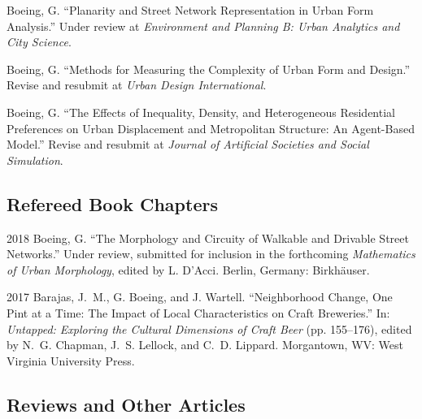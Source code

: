\documentclass{academiccv}
\begin{document}
\begin{tablist}

\item[\the\year] \tab Boeing, G. \enquote{Planarity and Street Network Representation in Urban Form Analysis.} Under review at \textit{Environment and Planning B: Urban Analytics and City Science}.

\item[\the\year] \tab Boeing, G. \enquote{Methods for Measuring the Complexity of Urban Form and Design.} Revise and resubmit at \textit{Urban Design International}.

\item[\the\year] \tab Boeing, G. \enquote{The Effects of Inequality, Density, and Heterogeneous Residential Preferences on Urban Displacement and Metropolitan Structure: An Agent-Based Model.} Revise and resubmit at \textit{Journal of Artificial Societies and Social Simulation}.

\end{tablist}



\subsection*{Refereed Book Chapters}

\begin{tablist}

\item[2018] \tab Boeing, G. \enquote{The Morphology and Circuity of Walkable and Drivable Street Networks.} Under review, submitted for inclusion in the forthcoming \textit{Mathematics of Urban Morphology}, edited by L. D'Acci. Berlin, Germany: Birkhäuser.

\item[2017] \tab Barajas, J.~M., G. Boeing, and J. Wartell. \enquote{Neighborhood Change, One Pint at a Time: The Impact of Local Characteristics on Craft Breweries.} In: \textit{Untapped: Exploring the Cultural Dimensions of Craft Beer} (pp. 155--176), edited by N.~G. Chapman, J.~S. Lellock, and C.~D. Lippard. Morgantown, WV: West Virginia University Press.

\end{tablist}



\subsection*{Reviews and Other Articles}
\end{document}

